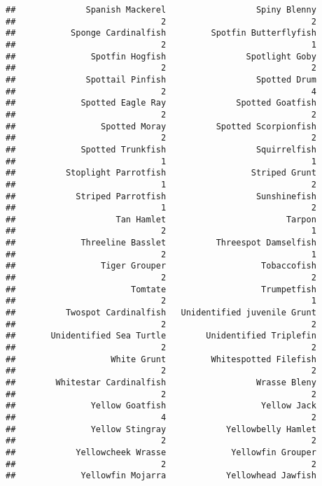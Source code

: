 \documentclass[
]{article}
\begin{document}
\begin{verbatim}
##              Spanish Mackerel                  Spiny Blenny 
##                             2                             2 
##           Sponge Cardinalfish         Spotfin Butterflyfish 
##                             2                             1 
##               Spotfin Hogfish                Spotlight Goby 
##                             2                             2 
##              Spottail Pinfish                  Spotted Drum 
##                             2                             4 
##             Spotted Eagle Ray              Spotted Goatfish 
##                             2                             2 
##                 Spotted Moray          Spotted Scorpionfish 
##                             2                             2 
##             Spotted Trunkfish                  Squirrelfish 
##                             1                             1 
##          Stoplight Parrotfish                 Striped Grunt 
##                             1                             2 
##            Striped Parrotfish                  Sunshinefish 
##                             1                             2 
##                    Tan Hamlet                        Tarpon 
##                             2                             1 
##             Threeline Basslet          Threespot Damselfish 
##                             2                             1 
##                 Tiger Grouper                   Tobaccofish 
##                             2                             2 
##                       Tomtate                   Trumpetfish 
##                             2                             1 
##          Twospot Cardinalfish   Unidentified juvenile Grunt 
##                             2                             2 
##       Unidentified Sea Turtle        Unidentified Triplefin 
##                             2                             2 
##                   White Grunt         Whitespotted Filefish 
##                             2                             2 
##        Whitestar Cardinalfish                  Wrasse Bleny 
##                             2                             2 
##               Yellow Goatfish                   Yellow Jack 
##                             4                             2 
##               Yellow Stingray            Yellowbelly Hamlet 
##                             2                             2 
##            Yellowcheek Wrasse             Yellowfin Grouper 
##                             2                             2 
##             Yellowfin Mojarra            Yellowhead Jawfish 

\end{verbatim}
\end{document}
